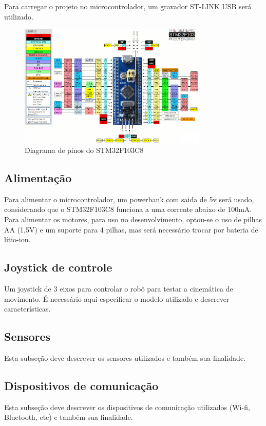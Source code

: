 Para carregar o projeto no microcontrolador, um gravador ST-LINK USB será utilizado.

\begin{figure}[h]
	\centering
	\includegraphics[width=0.8\textwidth]{figures/stm32f1_pinout}
	\caption{Diagrama de pinos do STM32F103C8}
\end{figure}

\subsection{Alimentação}
Para alimentar o microcontrolador, um powerbank com saida de 5v será usado, considerando que o STM32F103C8 funciona a
uma corrente abaixo de 100mA. Para alimentar os motores, para uso no desenvolvimento, optou-se o uso de pilhas AA (1,5V)
e um suporte para 4 pilhas, mas será necessário trocar por bateria de lítio-ion.

\subsection{Joystick de controle}
Um joystick de 3 eixos para controlar o robô para testar a cinemática de movimento.
{\color{red} É necessário aqui especificar o modelo utilizado e descrever características.}

\subsection{Sensores}
{\color{red} Esta subseção deve descrever os sensores utilizados e também sua finalidade.}

\subsection{Dispositivos de comunicação}
{\color{red} Esta subseção deve descrever os dispositivos de comunicação utilizados (Wi-fi, Bluetooth, etc) e também sua
finalidade.}

